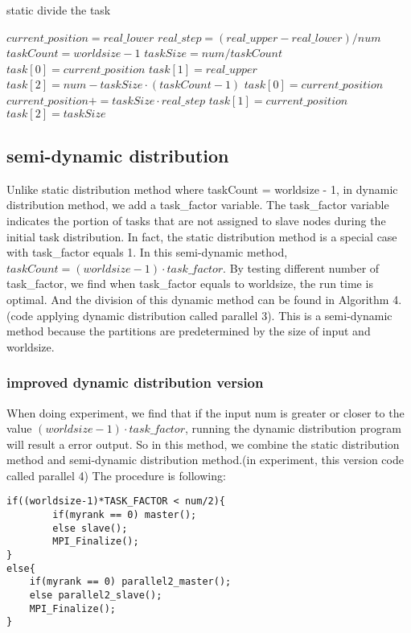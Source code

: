 \documentclass[a4paper]{article}
\begin{document}
\begin{algorithm}[H]
\begin{algorithmic}
\caption{static divide the task}
\STATE $current\_position = real\_lower$
\STATE $real\_step = (real\_upper-real\_lower)/num$
\STATE $taskCount = worldsize - 1$
\STATE $ taskSize = num / taskCount$
\STATE $task[0] = current\_position$
\STATE $task[1] = real\_upper$
\STATE $task[2] = num - taskSize \cdot (taskCount-1)$
\ELSE 
\STATE $task[0] = current\_position$
\STATE $current\_position += taskSize \cdot real\_step$
\STATE $task[1] = current\_position$
\STATE $task[2] = taskSize$
\ENDIF
\ENDFOR
\end{algorithmic}
\end{algorithm}

\subsection{semi-dynamic distribution}
Unlike static distribution method where taskCount = worldsize - 1, in dynamic distribution method, we add a task\_factor variable. The task\_factor variable indicates the portion of tasks that are not assigned to slave nodes during the initial task distribution. In fact, the static distribution method is a special case with task\_factor equals 1. In this semi-dynamic method, $taskCount = (worldsize - 1)\cdot task\_factor$. By testing different number of task\_factor, we find when task\_factor equals to worldsize, the run time is optimal. And the division of this dynamic method can be found in Algorithm 4.(code applying dynamic distribution called parallel 3). This is a semi-dynamic method because the partitions are predetermined by the size of input and worldsize.

\subsubsection{improved dynamic distribution version}
When doing experiment, we find that if the input num is greater or closer to the value $(worldsize - 1)\cdot task\_factor$, running the dynamic distribution program will result a error output. So in this method, we combine the static distribution method and semi-dynamic distribution method.(in experiment, this version code called parallel 4)
The procedure is following:

\begin{lstlisting}
if((worldsize-1)*TASK_FACTOR < num/2){
        if(myrank == 0) master();
        else slave();
        MPI_Finalize();
}
else{
    if(myrank == 0) parallel2_master();
    else parallel2_slave();
    MPI_Finalize();
}
\end{lstlisting}
\end{document}
